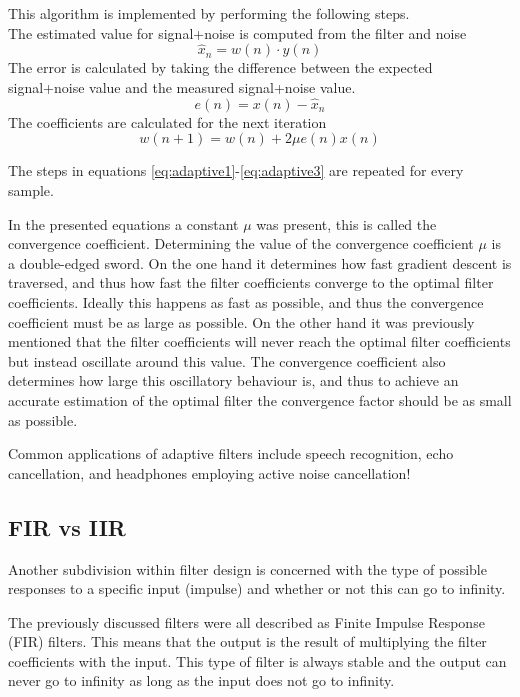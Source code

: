 This algorithm is implemented by performing the following steps. \\
The estimated value for signal+noise is computed from the filter and noise
\begin{equation}\label{eq:adaptive1}
    \hat{x}_n = w(n)\cdot y(n)
\end{equation}
The error is calculated by taking the difference between the expected signal+noise value and the measured signal+noise value.
\begin{equation}\label{eq:adaptive2}
    e(n) = x(n) - \hat{x}_n
\end{equation}
The coefficients are calculated for the next iteration
\begin{equation}\label{eq:adaptive3}
    w(n+1) = w(n) + 2 \mu e(n) x(n)
\end{equation}

The steps in equations \ref{eq:adaptive1}-\ref{eq:adaptive3} are repeated for every sample.

In the presented equations a constant $\mu$ was present, this is called the convergence coefficient. Determining the value of the convergence coefficient $\mu$ is a double-edged sword. On the one hand it determines how fast gradient descent is traversed, and thus how fast the filter coefficients converge to the optimal filter coefficients. Ideally this happens as fast as possible, and thus the convergence coefficient must be as large as possible. On the other hand it was previously mentioned that the filter coefficients will never reach the optimal filter coefficients but instead oscillate around this value. The convergence coefficient also determines how large this oscillatory behaviour is, and thus to achieve an accurate estimation of the optimal filter the convergence factor should be as small as possible. 

Common applications of adaptive filters include speech recognition, echo cancellation, and headphones employing active noise cancellation! \cite{active_noise_cancellation_wiener_filter} \cite{wiener_vs_adaptive_realtime_noisecancellation}

\subsection{FIR vs IIR}
Another subdivision within filter design is concerned with the type of possible responses to a specific input (impulse) and whether or not this can go to infinity.

The previously discussed filters were all described as Finite Impulse Response (FIR) filters. This means that the output is the result of multiplying the filter coefficients with the input. This type of filter is always stable and the output can never go to infinity as long as the input does not go to infinity.

